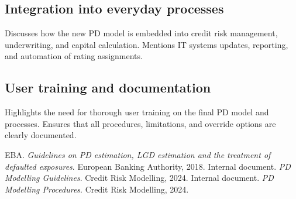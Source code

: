 \documentclass[12pt,a4paper]{article}
\begin{document}
\subsection{Integration into everyday processes}
Discusses how the new PD model is embedded into credit risk management, underwriting, and capital calculation. Mentions IT systems updates, reporting, and automation of rating assignments.

\subsection{User training and documentation}
Highlights the need for thorough user training on the final PD model and processes. Ensures that all procedures, limitations, and override options are clearly documented.

\begin{thebibliography}{99}
     EBA. \textit{Guidelines on PD estimation, LGD estimation and the treatment of defaulted exposures}. European Banking Authority, 2018.
     Internal document. \textit{PD Modelling Guidelines}. Credit Risk Modelling, 2024.
     Internal document. \textit{PD Modelling Procedures}. Credit Risk Modelling, 2024.
\end{thebibliography}
\end{document}
